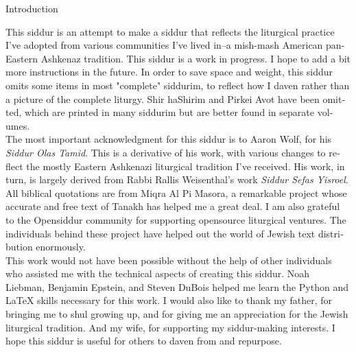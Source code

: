 \documentclass[twoside, openany, parskip=half, 11pt]{book}
\begin{document}
\begin{minipage}{\textwidth}

\begin{english}
\begin{center} %
\begin{LARGE}
Introduction
\end{LARGE}
\end{center}

This siddur is an attempt to make a siddur that reflects the liturgical practice I've adopted from various communities I've lived in--a mish-mash American pan-Eastern Ashkenaz tradition. This siddur is a work in progress. I hope to add a bit more instructions in the future. In order to save space and weight, this siddur omits some items in most "complete" siddurim, to reflect how I daven rather than a picture of the complete liturgy. Shir haShirim and Pirkei Avot have been omitted, which are printed in many siddurim but are better found in separate volumes.\\

The most important acknowledgment for this siddur is to Aaron Wolf, for his \textit{Siddur Olas Tamid}. This is a derivative of his work, with various changes to reflect the mostly Eastern Ashkenazi liturgical tradition I've received. His work, in turn, is largely derived from Rabbi Rallis Weisenthal's work \textit{Siddur Sefas Yisroel}. All biblical quotations are from Miqra Al Pi Masora, a remarkable project whose accurate and free text of Tanakh has helped me a great deal. I am also grateful to the Opensiddur community for supporting opensource liturgical ventures. The individuals behind these project have helped out the world of Jewish text distribution enormously.\\

This work would not have been possible without the help of other individuals who assisted me with the technical aspects of creating this siddur. Noah Liebman, Benjamin Epstein, and Steven DuBois helped me learn the Python and \LaTeX{} skills necessary for this work. I would also like to thank my father, for bringing me to shul growing up, and for giving me an appreciation for the Jewish liturgical tradition. And my wife, for supporting my siddur-making interests. I hope this siddur is useful for others to daven from and repurpose.

\end{english}

\end{minipage}
\end{document}

